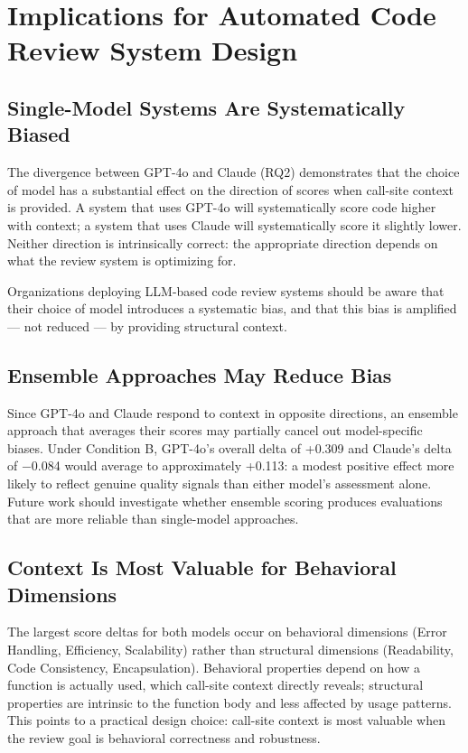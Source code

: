 \documentclass[12pt]{report}
\begin{document}
\section{Implications for Automated Code Review System Design}

\subsection{Single-Model Systems Are Systematically Biased}

The divergence between GPT-4o and Claude (RQ2) demonstrates that the choice of model has a substantial effect on the direction of scores when call-site context is provided. A system that uses GPT-4o will systematically score code higher with context; a system that uses Claude will systematically score it slightly lower. Neither direction is intrinsically correct: the appropriate direction depends on what the review system is optimizing for.

Organizations deploying LLM-based code review systems should be aware that their choice of model introduces a systematic bias, and that this bias is amplified --- not reduced --- by providing structural context.

\subsection{Ensemble Approaches May Reduce Bias}

Since GPT-4o and Claude respond to context in opposite directions, an ensemble approach that averages their scores may partially cancel out model-specific biases. Under Condition B, GPT-4o's overall delta of +0.309 and Claude's delta of $-$0.084 would average to approximately +0.113: a modest positive effect more likely to reflect genuine quality signals than either model's assessment alone. Future work should investigate whether ensemble scoring produces evaluations that are more reliable than single-model approaches.

\subsection{Context Is Most Valuable for Behavioral Dimensions}

The largest score deltas for both models occur on behavioral dimensions (Error Handling, Efficiency, Scalability) rather than structural dimensions (Readability, Code Consistency, Encapsulation). Behavioral properties depend on how a function is actually used, which call-site context directly reveals; structural properties are intrinsic to the function body and less affected by usage patterns. This points to a practical design choice: call-site context is most valuable when the review goal is behavioral correctness and robustness.
\end{document}
